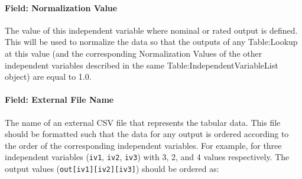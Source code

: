\paragraph{Field: Normalization
Value}\label{field-normalization-value}

The value of this independent variable where nominal or rated output is
defined. This will be used to normalize the data so that the outputs of
any Table:Lookup at this value (and the corresponding Normalization
Values of the other independent variables described in the same
Table:IndependentVariableList object) are equal to 1.0.

\paragraph{Field: External File
Name}\label{field-external-file-name-1}

The name of an external CSV file that represents the tabular data. This
file should be formatted such that the data for any output is ordered
according to the order of the corresponding independent variables. For
example, for three independent variables (\texttt{iv1}, \texttt{iv2},
\texttt{iv3}) with 3, 2, and 4 values respectively. The output values
(\texttt{out{[}iv1{]}{[}iv2{]}{[}iv3{]}}) should be ordered as:


